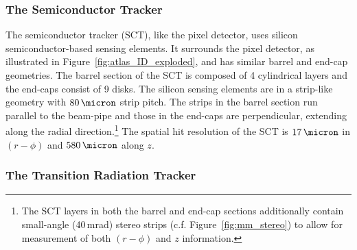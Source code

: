 
\subsubsection{The Semiconductor Tracker}
\label{sec:id_sct}

The semiconductor tracker (SCT), like the pixel detector, uses silicon semiconductor-based sensing
elements.
It surrounds the pixel detector, as illustrated in Figure~\ref{fig:atlas_ID_exploded},
and has similar barrel and end-cap geometries.
The barrel section of the SCT is composed of 4 cylindrical layers and the end-caps consist
of 9 disks.
The silicon sensing elements are in a strip-like geometry with
$80\,\micron$ strip pitch.
The strips in the barrel section run parallel to the beam-pipe and those in the
end-caps are perpendicular, extending along the radial direction.\footnote{
The SCT layers in both the barrel and end-cap sections additionally contain small-angle (40\,mrad) stereo strips (c.f. Figure~\ref{fig:mm_stereo}) to allow for measurement of both
$(r-\phi)$ and $z$ information.}
The spatial hit resolution of the SCT is $17\,\micron$ in $(r-\phi)$ and $580\,\micron$
along $z$.

\subsubsection{The Transition Radiation Tracker}
\label{sec:trt}

